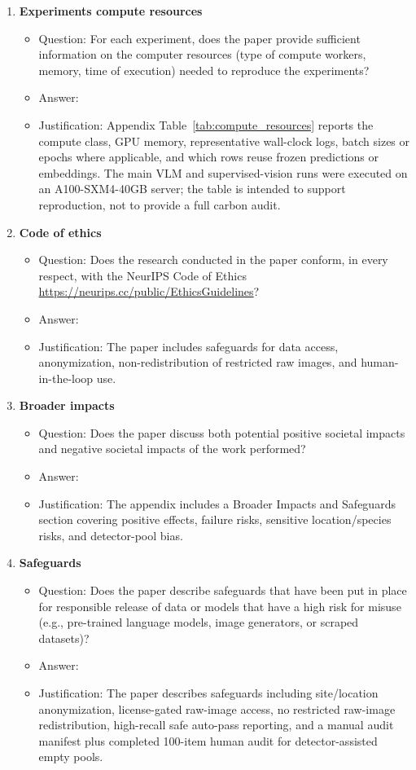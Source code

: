\begin{enumerate}
\item {\bf Experiments compute resources}
\begin{itemize}
    \item[] Question: For each experiment, does the paper provide sufficient information on the computer resources (type of compute workers, memory, time of execution) needed to reproduce the experiments?
    \item[] Answer: \answerYes{}
    \item[] Justification: Appendix Table~\ref{tab:compute_resources} reports the compute class, GPU memory, representative wall-clock logs, batch sizes or epochs where applicable, and which rows reuse frozen predictions or embeddings. The main VLM and supervised-vision runs were executed on an A100-SXM4-40GB server; the table is intended to support reproduction, not to provide a full carbon audit.
\end{itemize}

\item {\bf Code of ethics}
\begin{itemize}
    \item[] Question: Does the research conducted in the paper conform, in every respect, with the NeurIPS Code of Ethics \url{https://neurips.cc/public/EthicsGuidelines}?
    \item[] Answer: \answerYes{}
    \item[] Justification: The paper includes safeguards for data access, anonymization, non-redistribution of restricted raw images, and human-in-the-loop use.
\end{itemize}

\item {\bf Broader impacts}
\begin{itemize}
    \item[] Question: Does the paper discuss both potential positive societal impacts and negative societal impacts of the work performed?
    \item[] Answer: \answerYes{}
    \item[] Justification: The appendix includes a Broader Impacts and Safeguards section covering positive effects, failure risks, sensitive location/species risks, and detector-pool bias.
\end{itemize}

\item {\bf Safeguards}
\begin{itemize}
    \item[] Question: Does the paper describe safeguards that have been put in place for responsible release of data or models that have a high risk for misuse (e.g., pre-trained language models, image generators, or scraped datasets)?
    \item[] Answer: \answerYes{}
    \item[] Justification: The paper describes safeguards including site/location anonymization, license-gated raw-image access, no restricted raw-image redistribution, high-recall safe auto-pass reporting, and a manual audit manifest plus completed 100-item human audit for detector-assisted empty pools.
\end{itemize}


\end{enumerate}
